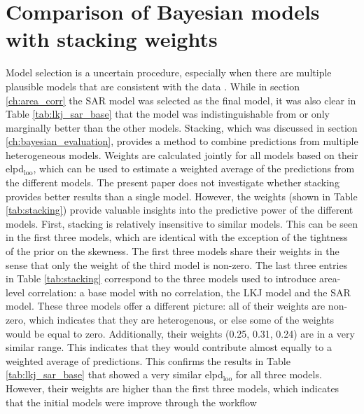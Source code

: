 \section{Comparison of Bayesian models with stacking weights}

Model selection is a uncertain procedure, especially when there are multiple plausible models that are consistent with the data \citep{gelman_bayesian_2020}.
While in section \ref{ch:area_corr} the SAR model was selected as the final model, it was also clear in Table \ref{tab:lkj_sar_base} that the model was indistinguishable from or only marginally better than the other models.
Stacking, which was discussed in section \ref{ch:bayesian_evaluation}, provides a method to combine predictions from multiple heterogeneous models.
Weights are calculated jointly for all models based on their elpd$_{\text{loo}}$, which can be used to estimate
a weighted average of the predictions from the different models.
The present paper does not investigate whether stacking provides better results than a single model.
However, the weights (shown in Table \ref{tab:stacking}) provide valuable insights into the predictive power of the different models.
First, stacking is relatively insensitive to similar models.
This can be seen in the first three models, which are identical with the exception of the tightness of the prior on the skewness.
The first three models share their weights in the sense that only the weight of the third model is non-zero.
The last three entries in Table \ref{tab:stacking} correspond to the three models used to introduce area-level correlation: a base model with no correlation, the LKJ model and the SAR model.
These three models offer a different picture: all of their weights are non-zero, which indicates that they are heterogenous, or else some of the weights would be equal to zero.
Additionally, their weights (0.25, 0.31, 0.24) are in a very similar range.
This indicates that they would contribute almost equally to a weighted average of predictions.
This confirms the results in Table \ref{tab:lkj_sar_base} that showed a very similar elpd$_{\text{loo}}$ for all three models.
However, their weights are higher than the first three models, which indicates that the initial models were improve through the workflow

